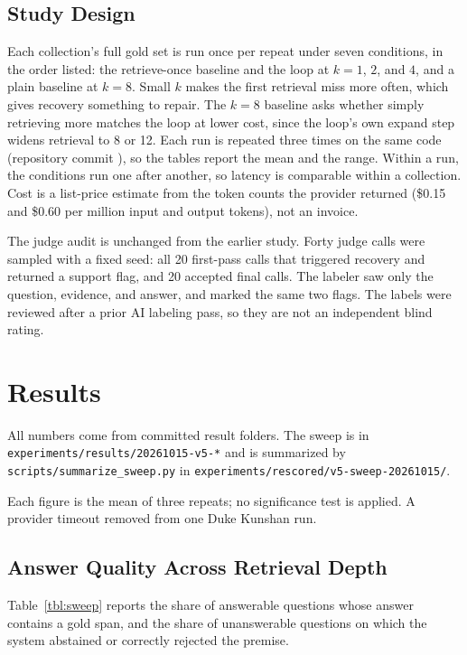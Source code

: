 \documentclass[12pt, a4paper, oneside]{report}
\newcommand{\code}[1]{\texttt{\detokenize{#1}}}
\begin{document}
\section{Study Design}

Each collection's full gold set is run once per repeat under seven
conditions, in the order listed: the retrieve-once baseline and the loop at
$k=1$, $2$, and $4$, and a plain baseline at $k=8$. Small $k$ makes the
first retrieval miss more often, which gives recovery something to repair.
The $k=8$ baseline asks whether simply retrieving more matches the loop at
lower cost, since the loop's own expand step widens retrieval to 8 or 12.
Each run is repeated three times on the same code (repository commit
\code{b125064}), so the tables report the mean and the range. Within a run,
the conditions run one after another, so latency is comparable within a
collection. Cost is a list-price estimate from the token counts the provider
returned (\$0.15 and \$0.60 per million input and output tokens), not an
invoice.

The judge audit is unchanged from the earlier study. Forty judge calls were
sampled with a fixed seed: all 20 first-pass calls that triggered recovery
and returned a support flag, and 20 accepted final calls. The labeler saw
only the question, evidence, and answer, and marked the same two flags. The
labels were reviewed after a prior AI labeling pass, so they are not an
independent blind rating.


\chapter{Results}
\label{results}

{\raggedright All numbers come from committed result folders. The sweep is
in \texttt{experiments/results/20261015-v5-*} and is summarized by
\texttt{scripts/summarize\_sweep.py} in
\texttt{experiments/rescored/v5-sweep-20261015/}.\par}
Each figure is the mean of three repeats; no significance test is applied.
A provider timeout removed \code{dku-020} from one Duke Kunshan run.

\section{Answer Quality Across Retrieval Depth}

Table~\ref{tbl:sweep} reports the share of answerable questions whose
answer contains a gold span, and the share of unanswerable questions on
which the system abstained or correctly rejected the premise.
\end{document}

